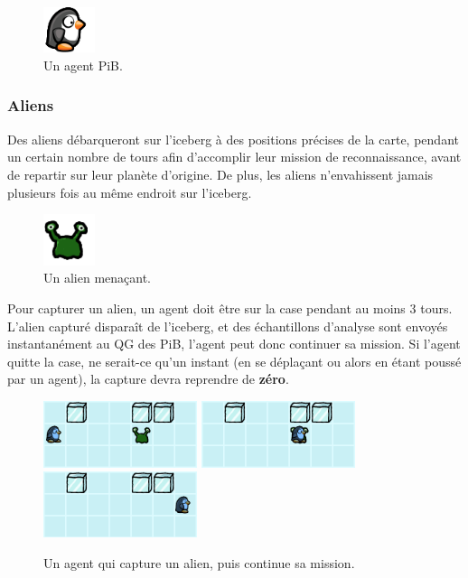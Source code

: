 \begin{figure}[!h]
    \centering
    \includegraphics[width=1.5cm]{img/penguin}
    \caption*{Un agent PiB.}
\end{figure}

\subsubsection{Aliens}\label{aliens}

Des aliens débarqueront sur l'iceberg à des positions précises de la
carte, pendant un certain nombre de tours afin d'accomplir leur mission
de reconnaissance, avant de repartir sur leur planète d'origine. De
plus, les aliens n'envahissent jamais plusieurs fois au même endroit sur
l'iceberg.

\begin{figure}[!h]
    \centering
    \includegraphics[width=1.5cm]{img/alien}
    \caption*{Un alien menaçant.}
\end{figure}

Pour capturer un alien, un agent doit être sur la case pendant au moins
3 tours. L'alien capturé disparaît de l'iceberg, et des échantillons
d'analyse sont envoyés instantanément au QG des PiB, l'agent peut donc
continuer sa mission. Si l'agent quitte la case, ne serait-ce qu'un
instant (en se déplaçant ou alors en étant poussé par un agent), la
capture devra reprendre de \textbf{zéro}.

\begin{figure}[!h]
    \centering
    \includegraphics[width=4.5cm]{img/alien_capture1}
    \includegraphics[width=4.5cm]{img/alien_capture2}
    \includegraphics[width=4.5cm]{img/alien_capture3}
    \caption*{Un agent qui capture un alien, puis continue sa mission.}
\end{figure}

